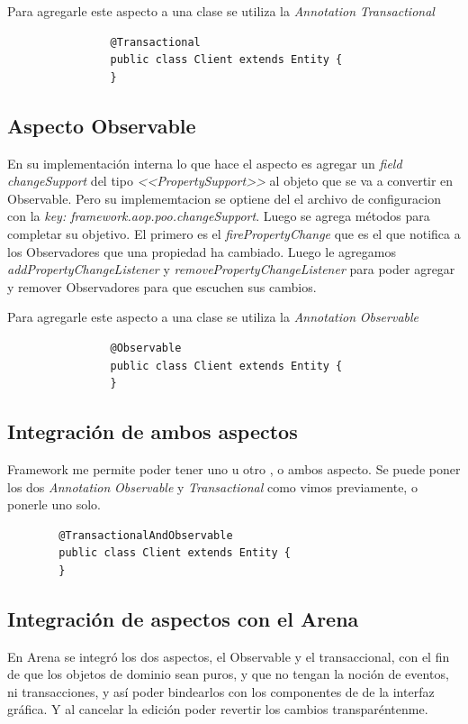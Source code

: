 		Para agregarle este aspecto a una clase se utiliza la \emph{Annotation}
		\emph{Transactional }
		
			\begin{lstlisting} 
				@Transactional
				public class Client extends Entity {
				}
			\end{lstlisting}

	\subsection{ Aspecto Observable}
			
		En su implementación interna lo que hace el aspecto es agregar un \emph{field
		changeSupport} del tipo \emph{<<PropertySupport>>} al objeto que se va a
		convertir en Observable. Pero su implememtacion se optiene del el archivo de
		configuracion con la \emph{key: framework.aop.poo.changeSupport}.
		Luego se agrega métodos para completar su objetivo.
		El primero es el \emph{firePropertyChange} que es el que notifica a los
		Observadores que una propiedad ha cambiado.	Luego le agregamos
		\emph{addPropertyChangeListener} y \emph{removePropertyChangeListener} para
		poder agregar y remover Observadores para que escuchen sus cambios.
		
		Para agregarle este aspecto a una clase se utiliza la \emph{Annotation}
		\emph{Observable}
		
			\begin{lstlisting} 
				@Observable
				public class Client extends Entity {
				}
			\end{lstlisting}
		


\subsection{Integración de ambos aspectos } 
	Framework me permite poder tener uno u otro , o
	ambos aspecto. Se puede poner los dos \emph{Annotation} \emph{Observable} y
	\emph{Transactional} como vimos previamente, o ponerle uno solo. 
	
	\begin{lstlisting} 
		@TransactionalAndObservable
		public class Client extends Entity {
		}
	\end{lstlisting}
	
	
	
\subsection{Integración de aspectos con el Arena}
	En Arena se integró los dos aspectos, el Observable y el transaccional, con el
	fin de que los objetos de dominio sean puros, y que no tengan la noción de
	eventos, ni transacciones, y así poder bindearlos con los componentes de de la
	interfaz gráfica. Y al cancelar la edición poder revertir los cambios
	transparéntenme.
	
